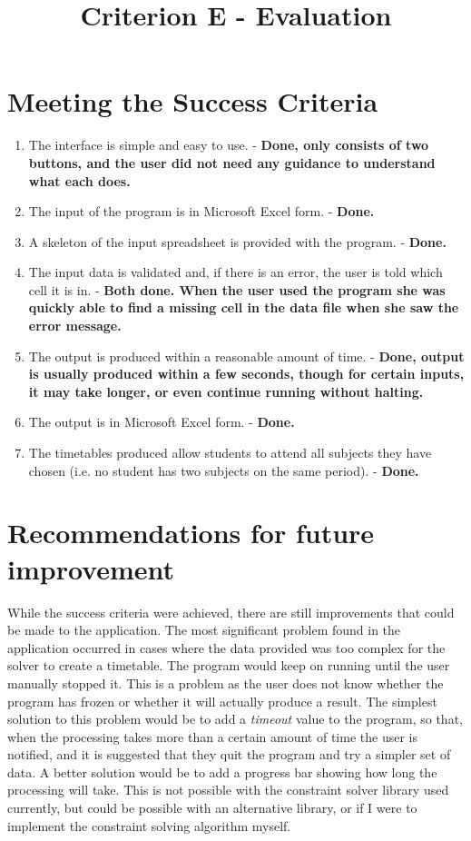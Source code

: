 \documentclass[a4paper, 12pt]{article}
\title{Criterion E - Evaluation}
\author{}
\date{}
\begin{document}
\maketitle

\section{Meeting the Success Criteria}
\begin{enumerate}
    \item The interface is simple and easy to use. - \textbf{Done, only consists of two
        buttons, and the user did not need any guidance to understand what each does.}
    \item The input of the program is in Microsoft Excel form. - \textbf{Done.}
    \item A skeleton of the input spreadsheet is provided with the program. - \textbf{Done.}
    \item The input data is validated and, if there is an error, the user is told which cell
        it is in. - \textbf{Both done. When the user used the program she was quickly able to
        find a missing cell in the data file when she saw the error message.}
    \item The output is produced within a reasonable amount of time. - \textbf{Done, output
        is usually produced within a few seconds, though for certain inputs, it may take
        longer, or even continue running without halting.}
    \item The output is in Microsoft Excel form. - \textbf{Done.}
    \item The timetables produced allow students to attend all subjects they have chosen
        (i.e. no student has two subjects on the same period). - \textbf{Done.}
\end{enumerate}

\section{Recommendations for future improvement}

While the success criteria were achieved, there are still improvements that could be made to
the application. The most significant problem found in the application occurred in cases
where the data provided was too complex for the solver to create a timetable. The program
would keep on running until the user manually stopped it. This is a problem as the user
does not know whether the program has frozen or whether it will actually produce a result.
The simplest solution to this problem would be to add a \emph{timeout} value to the program,
so that, when the processing takes more than a certain amount of time the user is notified,
and it is suggested that they quit the program and try a simpler set of data. A better
solution would be to add a progress bar showing how long the processing will take. This is
not possible with the constraint solver library used currently, but could be possible with
an alternative library, or if I were to implement the constraint solving algorithm myself. 
\end{document}

